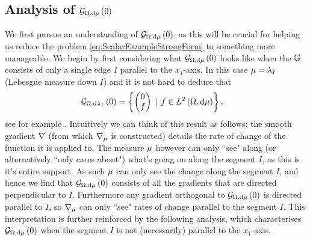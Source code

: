 \subsection{Analysis of $\mathcal{G}_{ \Omega, \mathrm{d}\mu}\left( 0 \right)$}
We first pursue an understanding of $\mathcal{G}_{ \Omega, \mathrm{d}\mu}\left( 0 \right)$, as this will be crucial for helping us reduce the problem \eqref{eq:ScalarExampleStrongForm} to something more manageable.
We begin by first considering what $\mathcal{G}_{ \Omega, \mathrm{d}\mu}\left( 0 \right)$ looks like when the $\mathbb{G}$ consists of only a single edge $I$ parallel to the $x_1$-axis.
In this case $\mu = \lambda_I$ (Lebesgue measure down $I$) and it is not hard to deduce that 
\begin{align*}
	\mathcal{G}_{ \Omega, \mathrm{d}\lambda_I}\left( 0 \right) &= 
	\left\{ 
		\begin{pmatrix} 0 \\ f	\end{pmatrix}
		\ \vert \ f\in L^{2}\left( \Omega,\mathrm{d}\mu \right)
	 \right\},
\end{align*}
see for example \cite{zhikov2000extension}.
Intuitively we can think of this result as follows: the smooth gradient $\nabla$ (from which $\nabla_\mu$ is constructed) details the rate of change of the function it is applied to.
The measure $\mu$ however can only ``see" along (or alternatively ``only cares about") what's going on along the segment $I$, as this is it's entire support.
As such $\mu$ can only see the change along the segment $I$, and hence we find that $\mathcal{G}_{ \Omega, \mathrm{d}\mu}\left( 0 \right)$ consists of all the gradients that are directed perpendicular to $I$.
Furthermore any gradient orthogonal to $\mathcal{G}_{ \Omega, \mathrm{d}\mu}\left( 0 \right)$ is directed parallel to $I$, so $\nabla_\mu$ can only ``see" rates of change parallel to the segment $I$.
This interpretation is further reinforced by the following analysis, which characterises $\mathcal{G}_{ \Omega, \mathrm{d}\mu}\left( 0 \right)$ when the segment $I$ is not (necessarily) parallel to the $x_1$-axis. \newline

